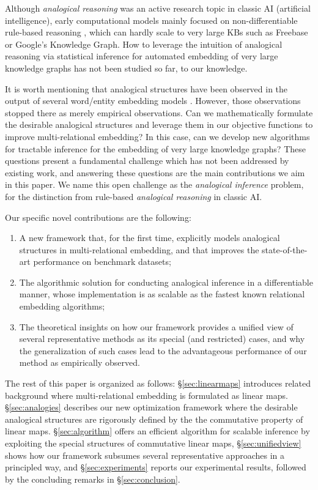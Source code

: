 \documentclass{article}
\begin{document}
Although \textit{analogical reasoning} was an active research topic in classic AI (artificial intelligence), early computational models mainly focused on non-differentiable rule-based reasoning \cite{gentner1983structure, falkenhainer1989structure, turney2008latent}, which can hardly scale to very large KBs such as Freebase or Google's Knowledge Graph.  How to leverage the intuition of analogical reasoning via statistical inference for automated embedding of very large knowledge graphs has not been studied so far, to our knowledge. 

It is worth mentioning that analogical structures have been observed in the output of several word/entity embedding models \cite{mikolov2013distributed, pennington2014glove}. However, those observations stopped there as merely empirical observations. Can we mathematically formulate the desirable analogical structures and leverage them in our objective functions to improve multi-relational embedding? In this case, can we develop new algorithms for tractable inference for the embedding of very large knowledge graphs?
These questions present a fundamental challenge which has not been addressed by existing work, and answering these questions are the main contributions we aim in this paper. We name this open challenge as the \textit{analogical inference} problem, for the distinction from rule-based \textit{analogical reasoning} in classic AI.



Our specific novel contributions are the following:
\begin{enumerate}
    \item A new framework that, for the first time,
        explicitly models analogical structures in multi-relational embedding,
        and that improves the state-of-the-art performance on benchmark datasets;
    \item The algorithmic solution for conducting analogical inference in a differentiable manner, whose implementation is as scalable as the fastest known relational embedding algorithms;
    \item The theoretical insights on how our framework provides a unified view of several representative methods as its special (and restricted) cases, and why the generalization of such cases lead to the advantageous performance of our method as empirically observed.
\end{enumerate}

The rest of this paper is organized as follows:
\S \ref{sec:linearmaps} introduces related background where multi-relational embedding is formulated as linear maps.
\S \ref{sec:analogies} describes our new optimization framework where the desirable analogical structures are rigorously defined by the the commutative property of linear maps.
\S \ref{sec:algorithm} offers an efficient algorithm for scalable inference by exploiting the special structures of commutative linear maps,
\S \ref{sec:unifiedview} shows how our framework subsumes several representative approaches in a principled way,
and \S \ref{sec:experiments} reports our experimental results,
followed by the concluding remarks in \S \ref{sec:conclusion}.
\end{document}

